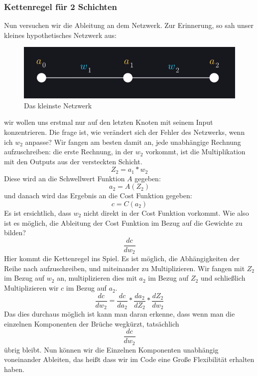 \documentclass[12pt]{article}
\begin{document}
\subsubsection{Kettenregel für 2 Schichten}
Nun versuchen wir die Ableitung an dem Netzwerk. Zur Erinnerung, so sah unser kleines hypothetisches Netzwerk aus:
\begin{figure}[H]
\centering
\includegraphics[scale=0.40]{./Images/Pasted image 20230912184748.png}
\caption{Das kleinste Netzwerk}
\label{Was kommt hier rein?}
\end{figure}
wir wollen uns erstmal nur auf den letzten Knoten mit seinem Input konzentrieren. Die frage ist, wie verändert sich der Fehler des Netzwerks, wenn ich $w_2$ anpasse?
Wir fangen am besten damit an, jede unabhängige Rechnung aufzuschreiben:
die erste Rechnung, in der $w_2$ vorkommt, ist die Multiplikation mit den Outputs aus der versteckten Schicht.
$$Z_2 = a_1*w_2$$
Diese wird an die Schwellwert Funktion $A$ gegeben:
$$a_2 = A(Z_2)$$
und danach wird das Ergebnis an die Cost Funktion gegeben:
$$c=C(a_2)$$
Es ist ersichtlich, dass $w_2$ nicht direkt in der Cost Funktion vorkommt. Wie also ist es möglich, die Ableitung der Cost Funktion im Bezug auf die Gewichte zu bilden?
$$\frac{dc}{dw_2}$$
Hier kommt die Kettenregel ins Spiel. Es ist möglich, die Abhängigkeiten der Reihe nach aufzuschreiben, und miteinander zu Multiplizieren. 
Wir fangen mit $Z_2$ im Bezug auf $w_2$ an, multiplizieren dies mit $a_2$ im Bezug auf $Z_2$ und schließlich Multiplizieren wir $c$ im Bezug auf $a_2$.
$$\frac{ dc }{ dw_{ 2 } }=
\frac{ dc }{ da_{ 2 } }*
\frac{ da_{ 2 } }{ dZ_{ 2 } }*
\frac{ dZ_{ 2 } }{ dw_{ 2 } }$$
Das dies durchaus möglich ist kann man daran erkenne, dass wenn man die einzelnen Komponenten der Brüche wegkürzt, tatsächlich $$\frac{ dc }{ dw_{ 2 } }$$  übrig bleibt.
Nun können wir die Einzelnen Komponenten unabhängig voneinander Ableiten, das heißt dass wir im Code eine Große Flexibilität erhalten haben.
\end{document}
